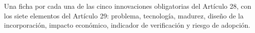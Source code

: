 %
%
%

  {Una ficha por cada una de las cinco innovaciones obligatorias del
   Artículo 28, con los siete elementos del Artículo 29: problema,
   tecnología, madurez, diseño de la incorporación, impacto económico,
   indicador de verificación y riesgo de adopción.}

\newcommand\fichaInnovacion[1]{\RegistroNuevo{t19}{#1}\audit@emitirficha}

